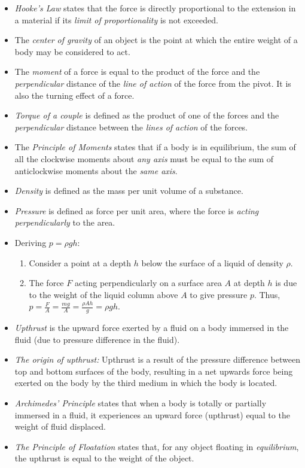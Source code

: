 \documentclass[oneside]{book}
\begin{document}
\begin{itemize}
    \item \textit{Hooke's Law} states that the force is directly proportional to the extension in a material if its \emph{limit of proportionality} is not exceeded.
    \item The \textit{center of gravity} of an object is the point at which the entire weight of a body may be considered to act.
    \item The \textit{moment} of a force is equal to the product of the force and the \emph{perpendicular} distance of the \emph{line of action} of the force from the pivot. It is also the turning effect of a force.
    \item \textit{Torque of a couple} is defined as the product of one of the forces and the \emph{perpendicular} distance between the \emph{lines of action} of the forces.
    \item The \textit{Principle of Moments} states that if a body is in equilibrium, the sum of all the clockwise moments about \emph{any axis} must be equal to the sum of anticlockwise moments about the \emph{same axis}.
    \item \textit{Density} is defined as the mass per unit volume of a substance.
    \item \textit{Pressure} is defined as force per unit area, where the force is \emph{acting perpendicularly} to the area.
    \item Deriving \(p=\rho gh\):
    \begin{enumerate}
        \item Consider a point at a depth \(h\) below the surface of a liquid of density \(\rho\). 
        \item The force \(F\) acting perpendicularly on a surface area \(A\) at depth \(h\) is due to the weight of the liquid column above \(A\) to give pressure \(p\). Thus, \(p=\frac{F}{A}=\frac{mg}{A}=\frac{\rho Ah}{g}=\rho gh\).
    \end{enumerate}
    \item \textit{Upthrust} is the upward force exerted by a fluid on a body immersed in the fluid (due to pressure difference in the fluid).
    \item \textit{The origin of upthrust:} Upthrust is a result of the pressure difference between top and bottom surfaces of the body, resulting in a net upwards force being exerted on the body by the third medium in which the body is located.
    \item \textit{Archimedes' Principle} states that when a body is totally or partially immersed in a fluid, it experiences an upward force (upthrust) equal to the weight of fluid displaced.
    \item \textit{The Principle of Floatation} states that, for any object floating in \emph{equilibrium}, the upthrust is equal to the weight of the object.
\end{itemize}
\end{document}
